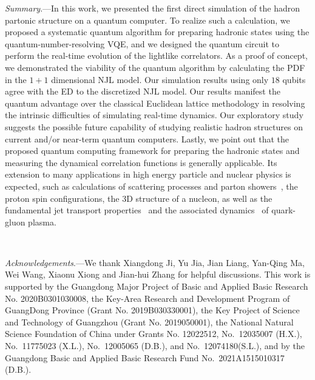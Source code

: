\documentclass[aps,prl,twocolumn,superscriptaddress,notitlepage,nofootinbib]{revtex4-1}
\newcommand{\old}[1]{{\color{red}\sout{#1}}}
\begin{document}
\textit{Summary}.---In this work, we presented the first direct simulation of the hadron partonic structure on a quantum computer.
To realize such a calculation, we proposed a systematic quantum algorithm for preparing hadronic states using the quantum-number-resolving VQE, and we designed the quantum circuit to perform the real-time evolution of the lightlike correlators. As a proof of concept, we demonstrated the viability of the quantum algorithm by calculating the PDF in the $1+1$ dimensional NJL model. Our simulation results using only $18$ qubits agree with the ED to the discretized NJL model. 
Our results manifest the quantum advantage over the classical Euclidean lattice methodology in resolving the intrinsic difficulties of simulating real-time dynamics. Our exploratory study suggests the possible future capability of studying realistic hadron structures on current and/or near-term quantum computers. %
Lastly, we point out that the proposed quantum computing framework for preparing the hadronic states and measuring the dynamical correlation functions is generally applicable. Its extension to many applications in high energy particle and nuclear physics is expected, such as calculations of scattering processes and parton showers~\cite{Bepari:2020xqi,Bauer:2019qxa,Bauer:2021gup}, the proton spin configurations, the 3D structure of a nucleon, as well as the fundamental jet transport properties~\cite{Barata:2021yri} and the associated dynamics~\cite{Cohen:2021imf,deJong:2020tvx} of quark-gluon plasma.



~~~~~
\begin{acknowledgments}
\textit{Acknowledgements}.---We thank Xiangdong Ji, Yu Jia, Jian Liang, Yan-Qing Ma, Wei Wang, Xiaonu Xiong and Jian-hui Zhang for helpful discussions. This work is supported by the Guangdong Major Project of Basic and Applied Basic Research No. 2020B0301030008, the Key-Area Research and Development Program of GuangDong Province (Grant No. 2019B030330001), the Key Project of Science and Technology of Guangzhou (Grant No. 2019050001), the National Natural Science Foundation of China under Grants No. 12022512, No.~12035007 (H.X.), No.~11775023 (X.L.), No.~12005065 (D.B.), and No.~12074180(S.L.), and by the Guangdong Basic and Applied Basic Research Fund No.~2021A1515010317 (D.B.). 
\end{acknowledgments}
\end{document}
